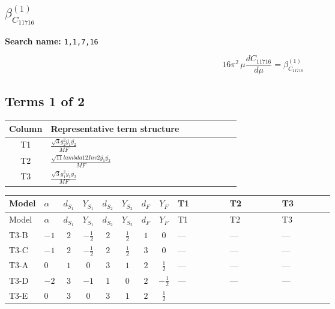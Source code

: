 \documentclass[8pt]{article}
\begin{document}
\begin{landscape}
\section*{$\beta_{C_{11716}}^{(1)}$}
\noindent\textbf{Search name: }\texttt{1,1,7,16}\par\smallskip
\[16\pi^2\,\mu\frac{d C_{11716}}{d\mu}=\beta_{C_{11716}}^{(1)}\]
\subsection*{Terms 1 of 2}
\begin{center}
\begin{tabular}{@{}c >{\raggedright\arraybackslash}p{0.82\linewidth}@{}}
\toprule
Column & Representative term structure \\
\midrule
T1 & \(\displaystyle \frac{\sqrt{3} g_{2}^{2} \overline{y_{1}} \overline{y_{2}}}{MF}\) \\
\midrule
T2 & \(\displaystyle \frac{\sqrt{11} lambda12Inv2 \overline{y_{1}} \overline{y_{2}}}{MF}\) \\
\midrule
T3 & \(\displaystyle \frac{\sqrt{3} g_{1}^{2} \overline{y_{1}} \overline{y_{2}}}{MF}\) \\
\midrule
\bottomrule
\end{tabular}
\end{center}
\smallskip
\tiny
\begin{longtable}{@{}llcccccc >{\raggedright\arraybackslash}p{0.21\linewidth} >{\raggedright\arraybackslash}p{0.21\linewidth} >{\raggedright\arraybackslash}p{0.21\linewidth}@{}}
\toprule
Model & $\alpha$ & $d_{S_1}$ & $Y_{S_1}$ & $d_{S_2}$ & $Y_{S_2}$ & $d_F$ & $Y_F$ & T1 & T2 & T3 \\
\midrule
\endfirsthead
\toprule
Model & $\alpha$ & $d_{S_1}$ & $Y_{S_1}$ & $d_{S_2}$ & $Y_{S_2}$ & $d_F$ & $Y_F$ & T1 & T2 & T3 \\
\midrule
\endhead
T3-B & $-1$ & $2$ & $-\frac{1}{2}$ & $2$ & $\frac{1}{2}$ & $1$ & $0$ & --- & --- & --- \\
\midrule
T3-C & $-1$ & $2$ & $-\frac{1}{2}$ & $2$ & $\frac{1}{2}$ & $3$ & $0$ & --- & --- & --- \\
\midrule
T3-A & $0$ & $1$ & $0$ & $3$ & $1$ & $2$ & $\frac{1}{2}$ & --- & --- & --- \\
\midrule
T3-D & $-2$ & $3$ & $-1$ & $1$ & $0$ & $2$ & $-\frac{1}{2}$ & --- & --- & --- \\
\midrule
T3-E & $0$ & $3$ & $0$ & $3$ & $1$ & $2$ & $\frac{1}{2}$ & \scriptsize\adjustbox{max width=\linewidth}{$\begin{gathered} - \frac{11 \sqrt{3} g_{2}^{2} \overline{y_{1}} \overline{y_{2}}}{8 MF}\end{gathered}$} & \scriptsize\adjustbox{max width=\linewidth}{$\begin{gathered} - \frac{3 \sqrt{11} lambda12Inv2 \overline{y_{1}} \overline{y_{2}}}{22 MF}\end{gathered}$} & \scriptsize\adjustbox{max width=\linewidth}{$\begin{gathered} - \frac{\sqrt{3} g_{1}^{2} \overline{y_{1}} \overline{y_{2}}}{8 MF}\end{gathered}$} \\

\end{longtable}
\end{landscape}
\end{document}
